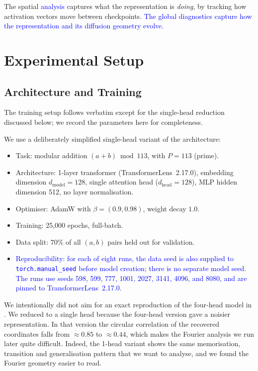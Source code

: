 \documentclass[11pt]{article}
\newcommand{\addedtext}[1]{\textcolor{blue}{#1}}
\theoremstyle{remark}
\begin{document}
The spatial \addedtext{analysis} captures what the representation is \emph{doing}, by tracking how activation vectors move between checkpoints. \addedtext{The global diagnostics capture how the representation and its diffusion geometry evolve.}

\section{Experimental Setup}

\subsection{Architecture and Training}

The training setup follows \citet{nanda2023progress} verbatim except for the single-head reduction discussed below; we record the parameters here for completeness.

We use a deliberately simplified single-head variant of the \citet{nanda2023progress} architecture:
\begin{itemize}
    \item Task: modular addition $(a + b) \bmod 113$, with $P = 113$ (prime).
    \item Architecture: 1-layer transformer (TransformerLens~2.17.0), embedding dimension $d_{\mathrm{model}} = 128$, single attention head ($d_{\mathrm{head}} = 128$), MLP hidden dimension 512, no layer normalisation.
    \item Optimiser: AdamW with $\beta = (0.9, 0.98)$, weight decay $1.0$.
    \item Training: 25{,}000 epochs, full-batch.
    \item Data split: 70\% of all $(a, b)$ pairs held out for validation.
    \item \addedtext{Reproducibility: for each of eight runs, the data seed is also supplied to \texttt{torch.manual\_seed} before model creation; there is no separate model seed. The runs use seeds 598, 599, 777, 1001, 2027, 3141, 4096, and 8080, and are pinned to TransformerLens~2.17.0.}
\end{itemize}

We intentionally did not aim for an exact reproduction of the four-head model in \citet{nanda2023progress}. We reduced to a single head because the four-head version gave a noisier representation. In that version the circular correlation of the recovered coordinates falls from $\approx 0.85$ to $\approx 0.44$, which makes the Fourier analysis we run later quite difficult. Indeed, the 1-head variant shows the same memorisation, transition and generalisation pattern that we want to analyse, and we found the Fourier geometry easier to read.
\end{document}
